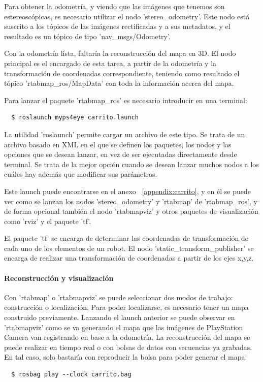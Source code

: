 Para obtener la odometría, y viendo que las imágenes que tenemos son
estereoscópicas, es necesario utilizar el nodo 'stereo\_odometry'. Este nodo
está suscrito a los tópicos de las imágenes rectificadas y a sus metadatos, y el
resultado es un tópico de tipo 'nav\_msgs/Odometry'.

Con la odometría lista, faltaría la reconstrucción del mapa en 3D. El nodo
principal es el encargado de esta tarea, a partir de la odometría y la
transformación de coordenadas correspondiente, teniendo como resultado el tópico
'rtabmap\_ros/MapData' con toda la información acerca del mapa.

Para lanzar el paquete 'rtabmap\_ros' es necesario introducir en una terminal:
\\
\begin{lstlisting}
  $ roslaunch myps4eye carrito.launch
\end{lstlisting}

La utilidad 'roslaunch' permite cargar un archivo de este tipo. Se trata de un
archivo basado en XML en el que se definen los paquetes, los nodos y las
opciones que se desean lanzar, en vez de ser ejecutadas directamente desde
terminal. Se trata de la mejor opción cuando se desean lanzar muchos nodos a los
cuáles hay además que modificar sus parámetros.

Este launch puede encontrarse en el anexo ~\ref{appendix:carrito}, y en él se
puede ver como se lanzan los nodos 'stereo\_odometry' y 'rtabmap' de
'rtabmap\_ros', y de forma opcional también el nodo 'rtabmapviz' y otros
paquetes de visualización como 'rviz' y el paquete 'tf'.

El paquete 'tf' se encarga de determinar las coordenadas de transformación de
cada uno de los elementos de un robot. El nodo 'static\_transform\_publisher' se
encarga de realizar una transformación de coordenadas a partir de los ejes
x,y,z.

\paragraph{Reconstrucción y visualización} \hspace{0pt}

Con 'rtabmap' o 'rtabmapviz' se puede seleccionar dos modos de trabajo:
construcción o localización. Para poder localizarse, es necesario tener un mapa
construido previamente. Lanzando el launch anterior se puede observar en
'rtabmapviz' como se va generando el mapa que las imágenes de PlayStation Camera
van registrando en base a la odometría. La reconstrucción del mapa se puede
realizar en tiempo real o con bolsas de datos con secuencias ya grabadas. En tal
caso, solo bastaría con reproducir la bolsa para poder generar el mapa:
\\
\begin{lstlisting}
  $ rosbag play --clock carrito.bag
\end{lstlisting}

